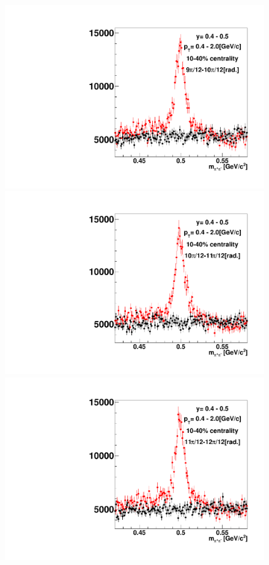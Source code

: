 \begin{figure}[h]
\includegraphics[width=0.14\linewidth]{chapterX/fig/ks_v1_sig/kf_ptslice0_cent1_ks_flow_phi10_rap0_check.pdf}
\includegraphics[width=0.14\linewidth]{chapterX/fig/ks_v1_sig/kf_ptslice0_cent1_ks_flow_phi11_rap0_check.pdf}
\includegraphics[width=0.14\linewidth]{chapterX/fig/ks_v1_sig/kf_ptslice0_cent1_ks_flow_phi12_rap0_check.pdf}


\end{figure}
